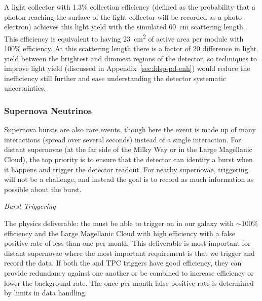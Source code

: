 A light collector with 1.3\% collection efficiency (defined as the probability that a photon reaching the surface of the light collector will be recorded as a photo-electron) achieves this light yield with the simulated \SI{60}{cm} scattering length. This efficiency is equivalent to having \SI{23}{cm^2} of active area per module with 100\% efficiency. At this scattering length there is a factor of 20 difference in light yield between the brightest and dimmest regions of the detector, so techniques to improve light yield (discussed in Appendix~\ref{sec:fdsp-pd-enh}) would reduce the inefficiency still further and ease understanding the detector systematic uncertainties.


\subsubsection{Supernova Neutrinos}
\label{subsec:fdsp-pd-simphys-snb}

Supernova bursts are also rare events, though here the event is made up of many interactions (spread over several seconds) instead of a single interaction. For distant supernovae (at the far side of the Milky Way or in the Large Magellanic Cloud), the top priority is to ensure that the detector can identify a burst when it happens and trigger the detector readout. For nearby supernovae, triggering will not be a challenge, and instead the goal is to record as much information as possible about the burst.

\textit{Burst Triggering}\nopagebreak
{}

The physics deliverable: the  must be able to trigger on  in our galaxy with $\sim100\%$ efficiency and the Large Magellanic Cloud with high efficiency with a false positive rate of less than one per month. This deliverable is most important for distant supernovae where the most important requirement is that we trigger and record the data. If both the  and TPC triggers have good efficiency, they can provide redundancy against one another or be combined to increase efficiency or lower the background rate. The once-per-month false positive rate is determined by limits in data handling.

